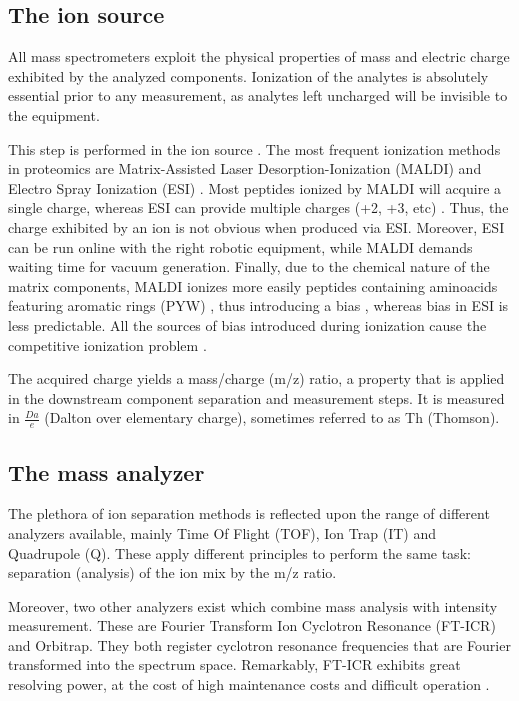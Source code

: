 \subsection{The ion source}
\label{subsec:the_ion_source}

All mass spectrometers exploit the physical properties of mass and electric charge exhibited by the analyzed components. Ionization of the analytes is absolutely essential prior to any measurement, as analytes left uncharged will be invisible to the equipment.


This step is performed in the ion source \cite{Barsnes2008}. The most frequent ionization methods in proteomics are Matrix-Assisted Laser Desorption-Ionization (\ac{MALDI}) and Electro Spray Ionization (\ac{ESI}) \cite{Mirzaei2016}. Most peptides ionized by \ac{MALDI} will acquire a single charge, whereas \ac{ESI} can provide multiple charges (+2, +3, etc) \cite{Joshi2016}. Thus, the charge exhibited by an ion is not obvious when produced via \ac{ESI}. Moreover, \ac{ESI} can be run online with the right robotic equipment, while \ac{MALDI} demands waiting time for vacuum generation. Finally, due to the chemical nature of the matrix components, MALDI ionizes more easily peptides containing aminoacids featuring aromatic rings (PYW) \cite{Hessling2013}, thus introducing a bias \cite{Hessling2013}, whereas bias in \ac{ESI} is less predictable. All the sources of bias introduced during ionization cause the competitive ionization problem \cite{Zhang2009} \cite{Tang2004}.

The acquired charge yields a mass/charge (\ac{m/z}) ratio, a property that is applied in the downstream component separation and measurement steps. It is measured in $\frac{Da}{e}$ (Dalton over elementary charge), sometimes referred to as Th (Thomson).

\subsection{The mass analyzer}
\label{subsec:the_mass_analyzer}

The plethora of ion separation methods is reflected upon the range of different analyzers available, mainly Time Of Flight (\ac{TOF}), Ion Trap (\ac{IT}) and Quadrupole (\ac{Q}). These apply different principles to perform the same task: separation (analysis) of the ion mix by the \ac{m/z} ratio.

Moreover, two other analyzers exist which combine mass analysis with intensity measurement. These are Fourier Transform Ion Cyclotron Resonance (\ac{FT-ICR}) and Orbitrap. They both register cyclotron resonance frequencies that are Fourier transformed into the spectrum space. Remarkably, \ac{FT-ICR} exhibits great resolving power, at the cost of high maintenance costs and difficult operation \cite{Barsnes2008}. 

